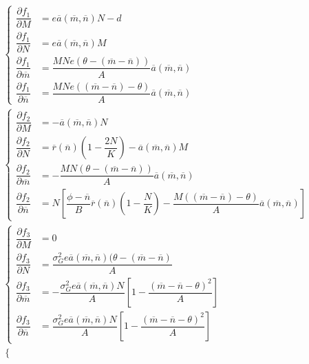 \documentclass[12pt]{article}
\begin{document}
\begin{align*}
	&\begin{cases}
		\dfrac{\partial f_1}{\partial M} &= e\overline{a}(\overline{m}, \overline{n})N - d \\[.25cm]
		\dfrac{\partial f_1}{\partial N} &= e\overline{a}(\overline{m}, \overline{n})M \\[.25cm]
		\dfrac{\partial f_1}{\partial \overline{m}} &= \dfrac{MNe(\theta - (\overline{m} - \overline{n}))}{A}\overline{a}(\overline{m} , \overline{n}) \\[.25cm]
		\dfrac{\partial f_1}{\partial \overline{n}} &= \dfrac{MNe((\overline{m} - \overline{n}) - \theta)}{A}\overline{a}(\overline{m} , \overline{n})
	\end{cases}\\
	&\begin{cases}
		\dfrac{\partial f_2}{\partial M} &= -\overline{a}(\overline{m}, \overline{n})N \\[.25cm]
		\dfrac{\partial f_2}{\partial N} &= \overline{r}(\overline{n})\left(1 - \dfrac{2N}{K}\right) - \overline{a}(\overline{m}, \overline{n})M \\[.25cm]
		\dfrac{\partial f_2}{\partial \overline{m}} &= -\dfrac{MN(\theta - (\overline{m} - \overline{n}))}{A}\overline{a}(\overline{m}, \overline{n}) \\[.25cm]
		\dfrac{\partial f_2}{\partial \overline{n}} &= N\left[\dfrac{\phi - \overline{n}}{B}\overline{r}(\overline{n})\left(1 - \dfrac{N}{K}\right) - \dfrac{M((\overline{m} - \overline{n}) - \theta)}{A}\overline{a}(\overline{m}, \overline{n})\right]
	\end{cases}\\
	&\begin{cases}
		\dfrac{\partial f_3}{\partial M} &= 0 \\[.25cm]
		\dfrac{\partial f_3}{\partial N} &= \dfrac{\sigma_G^2e \overline{a}(\overline{m},\overline{n})(\theta-(\overline{m}-\overline{n})}{A} \\[.25cm]
		\dfrac{\partial f_3}{\partial \overline{m}} &= -\dfrac{\sigma_G^2e \overline{a}(\overline{m},\overline{n})N}{A} \left[{1 - \dfrac{(\overline{m}-\overline{n}-\theta)^2}{A}}\right] \\[.25cm]
		\dfrac{\partial f_3}{\partial \overline{n}} &= \dfrac{\sigma_G^2e \overline{a}(\overline{m},\overline{n})N}{A} \left[{1 - \dfrac{(\overline{m}-\overline{n}-\theta)^2}{A}}\right]
	\end{cases}\\
	&\begin{cases}

\end{cases}
\end{align*}
\end{document}
